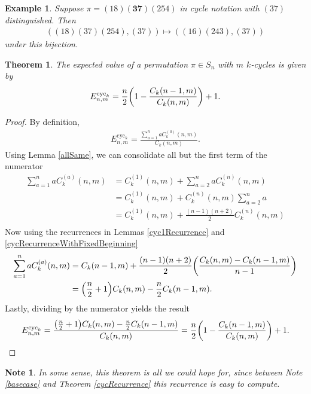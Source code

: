 \documentclass{article}
\let\originalleft\left
\let\originalright\right
\renewcommand{\left}{\mathopen{}\mathclose\bgroup\originalleft}
\renewcommand{\right}{\aftergroup\egroup\originalright}
\newtheorem{theorem}[theo]{Theorem}
\newtheorem{example}[theo]{Example}
\newtheorem{note}[theo]{Note}
\begin{document}
  \begin{example}
    Suppose $\pi = (18)\mathbf{(37)}(254)$ in cycle notation with $(37)$ distinguished.
    Then \begin{align}
      ((18)(37)(254), (37)) \mapsto ((16)(243), (37))
    \end{align} under this bijection.
  \end{example}
  \begin{theorem}
    \label{expectedValueCyc2}
    The expected value of a permutation $\pi \in S_n$ with $m$ $k$-cycles is
    given by \begin{align}
      E_{n,m}^{\text{cyc}_k} = \frac n2\left(1 - \frac{C_k(n-1,m)}{C_k(n,m)}\right) + 1.
    \end{align}
  \end{theorem}
  \begin{proof}
    By definition, \begin{align}
      E_{n,m}^{\text{cyc}_k} = \frac{
        \displaystyle \sum_{a = 1}^n aC_k^{(a)}(n, m)
      }{
        C_k(n, m)
      }.
    \end{align} Using Lemma \ref{allSame}, we can consolidate all but the first term of
    the numerator \begin{align}
      \sum_{a = 1}^n aC_k^{(a)}(n, m) &=
      C_k^{(1)}(n,m) +
      \sum_{a = 2}^n aC_k^{(n)}(n, m) \\
      &= C_k^{(1)}(n,m) + C_k^{(n)}(n, m)\sum_{a = 2}^n a \\
      &= C_k^{(1)}(n,m) + \frac{(n-1)(n+2)}{2} C_k^{(n)}(n, m) \\
    \end{align}
    Now using the recurrences in Lemmas \ref{cyc1Recurrence} and
    \ref{cycRecurrenceWithFixedBeginning} \begin{align}
      \sum_{a = 1}^n aC_k^{(a)}(n, m) &=
      C_k(n-1,m) + \frac{(n-1)(n+2)}{2}\left(
        \frac{C_k(n, m) - C_k(n-1, m)}{n - 1}
      \right) \\
      &= \left(\frac{n}{2} + 1\right) C_k(n,m) - \frac n2C_k(n-1,m).
    \end{align}
    Lastly, dividing by the numerator yields the result \begin{align}
      E_{n,m}^{\text{cyc}_k}
      = \frac{
        \left(\frac{n}{2} + 1\right) C_k(n,m) - \frac n2C_k(n-1,m)
      }{
        C_k(n, m)
      }
      = \frac n2\left(1 - \frac{C_k(n-1,m)}{C_k(n,m)}\right) + 1.
    \end{align}
  \end{proof}
  \begin{note}
    In some sense, this theorem is all we could hope for, since between 
    Note \ref{basecase} and Theorem \ref{cycRecurrence} 
    this recurrence is easy to compute.
  \end{note}
\end{document}
